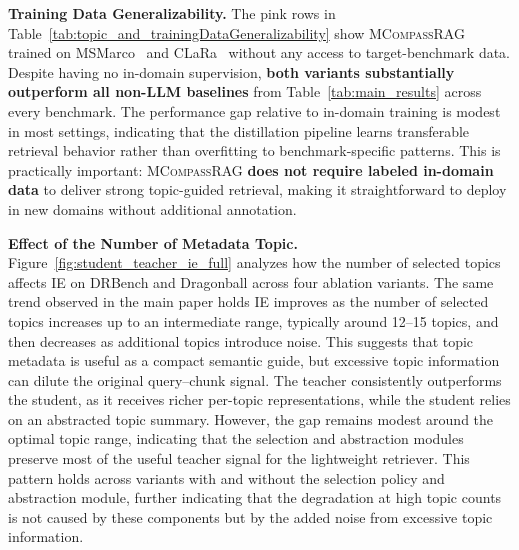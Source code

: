 \documentclass{llmxive}
\providecommand{\name}[1]{\textsc{MCompassRAG}\xspace}
\begin{document}
\noindent
\textbf{Training Data Generalizability. }
The \colorbox{pink!15}{pink rows} in Table~\ref{tab:topic_and_trainingDataGeneralizability} show \name{} trained on MSMarco~\cite{DBLP:journals/corr/NguyenRSGTMD16} and CLaRa~\cite{he2025clarabridgingretrievalgeneration} without any access to target-benchmark data. Despite having no in-domain supervision, \textbf{both variants substantially outperform all non-LLM baselines} from Table~\ref{tab:main_results} across every benchmark. The performance gap relative to in-domain training is modest in most settings, indicating that the distillation pipeline learns transferable retrieval behavior rather than overfitting to benchmark-specific patterns. This is practically important: \name{} \textbf{does not require labeled in-domain data} to deliver strong topic-guided retrieval, making it straightforward to deploy in new domains without additional annotation.

\noindent
\textbf{Effect of the Number of Metadata Topic. }
Figure~\ref{fig:student_teacher_ie_full} analyzes how the number of selected topics affects IE on DRBench and Dragonball across four ablation variants. The same trend observed in the main paper holds IE improves as the number of selected topics increases up to an intermediate range, typically around 12--15 topics, and then decreases as additional topics introduce noise. This suggests that topic metadata is useful as a compact semantic guide, but excessive topic information can dilute the original query--chunk signal. The teacher consistently outperforms the student, as it receives richer per-topic representations, while the student relies on an abstracted topic summary. However, the gap remains modest around the optimal topic range, indicating that the selection and abstraction modules preserve most of the useful teacher signal for the lightweight retriever. This pattern holds across variants with and without the selection policy and abstraction module, further indicating that the degradation at high topic counts is not caused by these components but by the added noise from excessive topic information.
\end{document}

